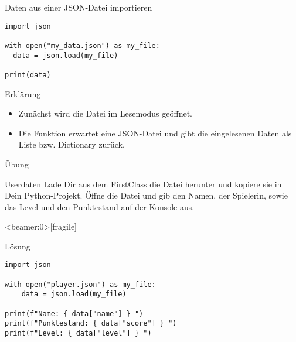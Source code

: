 \begin{fragile}
\begin{block}{Daten aus einer JSON-Datei importieren}
\vspace{2pt}

\begin{verbatim}
import json 

with open("my_data.json") as my_file:
  data = json.load(my_file)
  
print(data)
\end{verbatim}

\pause

\vspace{12pt}

\begin{exampleblock}{Erklärung}
\vspace{2pt}
\begin{itemize}[<+->]
\item Zunächst wird die Datei  im Lesemodus geöffnet.  
\item Die Funktion  erwartet eine JSON-Datei und gibt die eingelesenen Daten als Liste bzw. Dictionary zurück.  
\end{itemize}
\end{exampleblock}
\end{block}
\end{fragile}



\begin{frame}{Übung}
\begin{block}{Userdaten}
\vspace{2pt}
Lade Dir aus dem FirstClass die Datei  herunter und kopiere sie in Dein Python-Projekt. 
Öffne die Datei und gib den Namen, der Spielerin, sowie das Level und den Punktestand auf der Konsole aus. 
\end{block}
\end{frame}



\begin{frame}<beamer:0>[fragile]{}
\begin{solutionblock}{Lösung}

\begin{verbatim}
import json 

with open("player.json") as my_file:
    data = json.load(my_file)

print(f"Name: { data["name"] } ")
print(f"Punktestand: { data["score"] } ")
print(f"Level: { data["level"] } ") 
\end{verbatim}
\end{solutionblock}
\end{frame}


